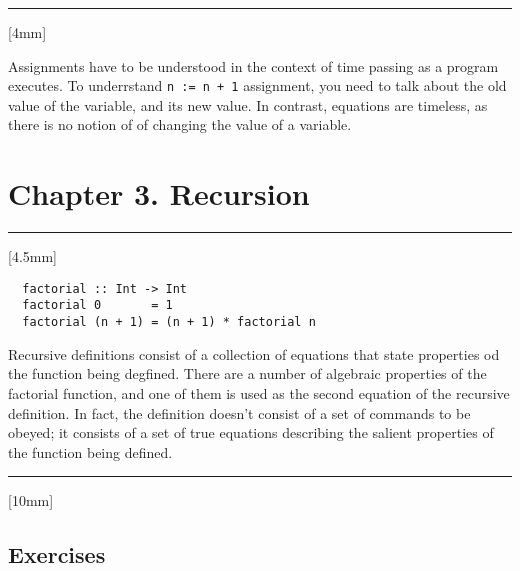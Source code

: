 \documentclass[11pt,a4paper]{article}
\theoremstyle{definition}
\begin{document}
\rule{\textwidth}{0.1pt}\vspace{5mm}
[4mm]

Assignments have to be understood in the context of time passing as a program executes.
To underrstand \texttt{n := n + 1} assignment, you need to talk about the old value
of the variable, and its new value. In contrast, equations are timeless, as there is
no notion of of changing the value of a variable. 


\newpage
\section*{Chapter 3. Recursion}


\vspace{5mm}\rule{\textwidth}{0.1pt}\vspace{5mm}
[4.5mm]


\begin{lstlisting} 
  factorial :: Int -> Int
  factorial 0       = 1
  factorial (n + 1) = (n + 1) * factorial n
\end{lstlisting}

\vspace{5mm}

Recursive definitions consist of a collection of equations that state properties od 
the function being degfined. There are a number of algebraic properties of the 
factorial function, and one of them is used as the second equation of the recursive 
definition. In fact, the definition doesn't consist of a set of commands to be 
obeyed; it consists of a set of true equations describing the salient properties 
of the function being defined. 


\vspace{5mm}\rule{\textwidth}{0.1pt}
[10mm]

\subsection*{Exercises}

\vspace{5mm}
\end{document}
